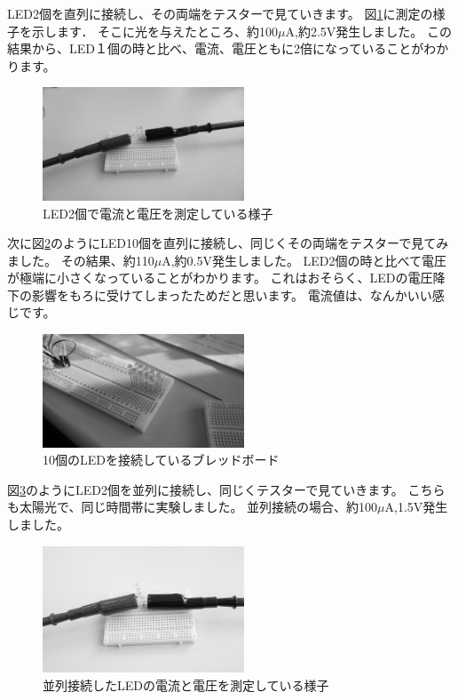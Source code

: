 LED2個を直列に接続し、その両端をテスターで見ていきます。
図\ref{fig:led2}に測定の様子を示します．
そこに光を与えたところ、約100$\mu\si\ampere$,約2.5$\si\volt$発生しました。
この結果から、LED１個の時と比べ、電流、電圧ともに2倍になっていることがわかります。

\begin{figure}[htbp]
    \centering
    \includegraphics[width=60mm]{./assets/mouse/gray/12.JPG}
    \caption{LED2個で電流と電圧を測定している様子}
    \label{fig:led2}
\end{figure}

次に図\ref{fig:led10}のようにLED10個を直列に接続し、同じくその両端をテスターで見てみました。
その結果、約110$\mu\si\ampere$,約0.5$\si\volt$発生しました。
LED2個の時と比べて電圧が極端に小さくなっていることがわかります。
これはおそらく、LEDの電圧降下の影響をもろに受けてしまったためだと思います。
電流値は、なんかいい感じです。


\begin{figure}[htbp]
    \centering
    \includegraphics[width=60mm]{./assets/mouse/gray/4.JPG}
    \caption{10個のLEDを接続しているブレッドボード}
    \label{fig:led10}
\end{figure}

図\ref{fig:led_par}のようにLED2個を並列に接続し、同じくテスターで見ていきます。
こちらも太陽光で、同じ時間帯に実験しました。
並列接続の場合、約100$\mu\si\ampere$,1.5$\si\volt$発生しました。


\begin{figure}[htbp]
    \centering
    \includegraphics[width=60mm]{./assets/mouse/gray/13.JPG}
    \caption{並列接続したLEDの電流と電圧を測定している様子}
    \label{fig:led_par}
\end{figure}


